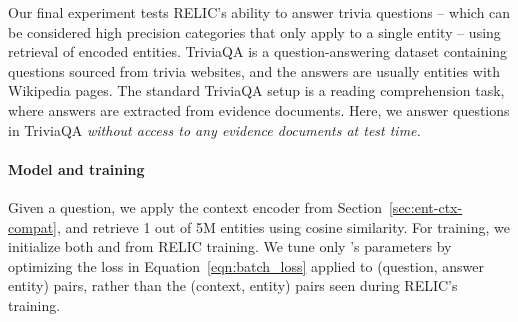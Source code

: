 \documentclass{article} \usepackage{iclr2020_conference,times}
\newcommand{\ack}{RELIC\xspace}
\begin{document}
\begin{comment}
\begin{table*}[]
    \small
    \centering
    \begin{tabular}{|c|cc|cc|cc|cc|}
    \hline
    & \multicolumn{2}{c|}{Web} & \multicolumn{2}{c|}{Web verified} & \multicolumn{2}{c|}{Wiki} & \multicolumn{2}{c|}{Wiki verified} \\
    & EM & F1 & EM & F1 & EM & F1 & EM & F1 \\
    \hline
    Classifier \citep{joshi2017triviaqa} & 24.0 & 28.4 & 30.2& 34.7 & 22.5 & 26.5 & 27.3 & 31.4 \\
    SLQA \citep{wang2018multi} & 68.7 & 73.1 & 82.4 & 85.4 & 66.6 & 71.4 & 74.8 & 78.7 \\
    \ack & 39.9 & 43.4 & 44.3 & 47.6 & 38.3 & 41.8 & 40.6 & 44.5 \\
    \hline
    \end{tabular}
    \caption{TriviaQA results. \ack~simply embeds the question and finds the closest entity. The other two approaches have access to evidence documents at  top rows build representations from (entity, context) pairs. The bottom two rows have access to evidence documents at test time.}
    \label{tab:triviaqa_results}
\end{table*}
\end{comment}

Our final experiment tests \ack's ability to answer trivia questions -- which can be considered high precision categories that only apply to a single entity -- using retrieval of encoded entities.
TriviaQA \citep{joshi2017triviaqa} is a question-answering dataset containing questions sourced from trivia websites, and the answers are usually entities with Wikipedia pages. The standard TriviaQA setup is a reading comprehension task, where answers are extracted from evidence documents.
Here, we answer questions in TriviaQA \emph{without access to any evidence documents at test time.}

\paragraph{Model and training} Given a question, we apply the context encoder  from Section~\ref{sec:ent-ctx-compat}, and retrieve 1 out of 5M entities using cosine similarity.
For training, we initialize both  and  from \ack training. We tune only 's parameters by optimizing the loss in Equation~\ref{eqn:batch_loss} applied to (question, answer entity) pairs, rather than the (context, entity) pairs seen during \ack's training.
\end{document}
